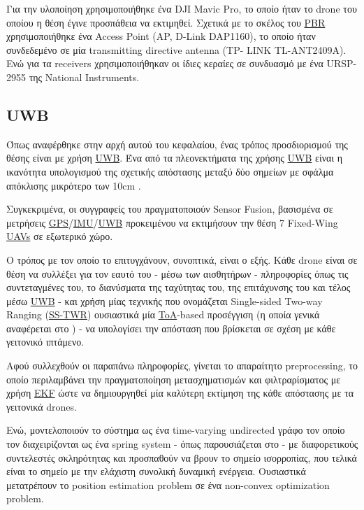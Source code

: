Για την υλοποίηση χρησιμοποιήθηκε ένα DJI Mavic Pro, το οποίο ήταν το drone του οποίου η θέση έγινε προσπάθεια να εκτιμηθεί.
Σχετικά με το σκέλος του \hyperref[abbr:PBR]{PBR} χρησιμοποιήθηκε ένα Access Point (AP, D-Link DAP1160), το οποίο ήταν συ\-νδε\-δε\-μέ\-νο σε μία transmitting directive antenna (TP-
LINK TL-ANT2409A). Ενώ για τα receivers χρησιμοποιήθηκαν οι ίδιες κεραίες σε συνδυασμό με ένα URSP-2955 της National
Instruments.


\subsection{UWB}
Όπως αναφέρθηκε στην αρχή αυτού του κεφαλαίου, ένας τρόπος προσδιορισμού της θέσης είναι με χρήση \hyperref[abbr:UWB]{UWB}.
Ένα από τα πλεονεκτήματα της χρήσης \hyperref[abbr:UWB]{UWB} είναι η ικανότητα υπολογισμού της σχετικής απόστασης μεταξύ δύο
σημείων με σφάλμα απόκλισης μικρότερο των 10cm \cite{uwb-accuracy}.

Συγκεκριμένα, οι συγγραφείς του \cite{uwb-imu-gps1} πραγματοποιούν Sensor Fusion, βασισμένα σε μετρήσεις 
\hyperref[abbr:GPS]{GPS}/\hyperref[abbr:IMU]{IMU}/\hyperref[abbr:UWB]{UWB} προκειμένου να εκτιμήσουν την θέση 
7 Fixed-Wing \hyperref[abbr:UAV]{UAVs} σε εξωτερικό χώρο.

Ο τρόπος με τον οποίο το επιτυγχάνουν, συνοπτικά, είναι ο εξής. Κάθε drone είναι σε θέση να συλλέξει για τον εαυτό του 
- μέσω των αισθητήρων - πληροφορίες όπως τις συντεταγμένες του, το διανύσματα της ταχύτητας του, της
επιτάχυνσης του και τέλος μέσω \hyperref[abbr:UWB]{UWB} - και χρήση μίας τεχνικής που ονομάζεται Single-sided Two-way Ranging 
(\hyperref[abbr:SS-TWR]{SS-TWR}) ουσιαστικά μία \hyperref[abbr:ToA]{ToA}-based προσέγγιση (η οποία γενικά αναφέρεται 
στο ) - να υπολογίσει την απόσταση που βρίσκεται σε σχέση με κάθε γειτονικό ιπτάμενο.

Αφού συλλεχθούν οι παραπάνω πληροφορίες, γίνεται το απαραίτητο preprocessing, το οποίο περιλαμβάνει την πραγματοποίηση μετασχηματισμών
και φιλτραρίσματος με χρήση \hyperref[abbr:EKF]{EKF} ώστε να δημιουργηθεί μία καλύτερη εκτίμηση της κάθε απόστασης με τα γειτονικά drones.

Ενώ, μοντελοποιούν το σύστημα ως ένα time-varying undirected γράφο τον οποίο τον διαχειρίζονται ως ένα spring system - όπως παρουσιάζεται στο 
 - με διαφορετικούς συντελεστές σκληρότητας και προσπαθούν να βρουν το σημείο ισορροπίας, που τελικά είναι το σημείο 
με την ελάχιστη συνολική δυναμική ενέργεια. Ουσιαστικά μετατρέπουν το position estimation problem σε ένα non-convex optimization problem.



